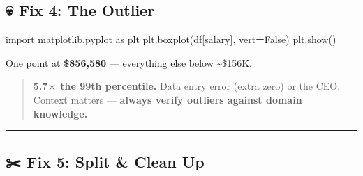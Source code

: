 \documentclass[
]{article}
\newenvironment{Shaded}{\begin{snugshade}}{\end{snugshade}}
\newcommand{\CommentTok}[1]{\textcolor[rgb]{0.56,0.35,0.01}{\textit{#1}}}
\newcommand{\DecValTok}[1]{\textcolor[rgb]{0.00,0.00,0.81}{#1}}
\newcommand{\FloatTok}[1]{\textcolor[rgb]{0.00,0.00,0.81}{#1}}
\newcommand{\ImportTok}[1]{#1}
\newcommand{\NormalTok}[1]{#1}
\newcommand{\OperatorTok}[1]{\textcolor[rgb]{0.81,0.36,0.00}{\textbf{#1}}}
\newcommand{\StringTok}[1]{\textcolor[rgb]{0.31,0.60,0.02}{#1}}
\newcommand{\VariableTok}[1]{\textcolor[rgb]{0.00,0.00,0.00}{#1}}
\begin{document}
\subsection{💀 Fix 4: The Outlier}\label{fix-4-the-outlier}

\begin{Shaded}
\begin{Highlighting}[]
\ImportTok{import}\NormalTok{ matplotlib.pyplot }\ImportTok{as}\NormalTok{ plt}
\NormalTok{plt.boxplot(df[}\StringTok{\textquotesingle{}salary\textquotesingle{}}\NormalTok{], vert}\OperatorTok{=}\VariableTok{False}\NormalTok{)}
\NormalTok{plt.show()}
\end{Highlighting}
\end{Shaded}

One point at \textbf{\$856,580} --- everything else below
\textasciitilde\$156K.

\begin{Shaded}
\end{Shaded}

\begin{quote}
\textbf{5.7× the 99th percentile.} Data entry error (extra zero) or the
CEO. Context matters --- \textbf{always verify outliers against domain
knowledge.}
\end{quote}

\begin{center}\rule{0.5\linewidth}{0.5pt}\end{center}

\subsection{✂️ Fix 5: Split \& Clean Up}\label{fix-5-split-clean-up}
\end{document}
